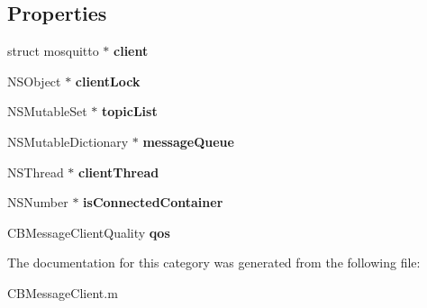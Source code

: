 \subsection*{Properties}
\begin{DoxyCompactItemize}
\item 
\hypertarget{category_c_b_message_client_07_08_a6dd8044dd2d87c74a8274dd2d772d18c}{struct mosquitto $\ast$ {\bfseries client}}\label{category_c_b_message_client_07_08_a6dd8044dd2d87c74a8274dd2d772d18c}

\item 
\hypertarget{category_c_b_message_client_07_08_a8ea5e9fc7bd6109f0e0bf0a5149ce281}{N\+S\+Object $\ast$ {\bfseries client\+Lock}}\label{category_c_b_message_client_07_08_a8ea5e9fc7bd6109f0e0bf0a5149ce281}

\item 
\hypertarget{category_c_b_message_client_07_08_a352f0fd7c3c5b009801f1d5164fe684f}{N\+S\+Mutable\+Set $\ast$ {\bfseries topic\+List}}\label{category_c_b_message_client_07_08_a352f0fd7c3c5b009801f1d5164fe684f}

\item 
\hypertarget{category_c_b_message_client_07_08_a084c1c0326a36184f673f698eb82cd34}{N\+S\+Mutable\+Dictionary $\ast$ {\bfseries message\+Queue}}\label{category_c_b_message_client_07_08_a084c1c0326a36184f673f698eb82cd34}

\item 
\hypertarget{category_c_b_message_client_07_08_ab510d95792c9d50028d6fa2d34a1a995}{N\+S\+Thread $\ast$ {\bfseries client\+Thread}}\label{category_c_b_message_client_07_08_ab510d95792c9d50028d6fa2d34a1a995}

\item 
\hypertarget{category_c_b_message_client_07_08_a481825e10342415caf9e0f592b606bc5}{N\+S\+Number $\ast$ {\bfseries is\+Connected\+Container}}\label{category_c_b_message_client_07_08_a481825e10342415caf9e0f592b606bc5}

\item 
\hypertarget{category_c_b_message_client_07_08_a7f10d284507cb889192b0a8ea8de88cc}{C\+B\+Message\+Client\+Quality {\bfseries qos}}\label{category_c_b_message_client_07_08_a7f10d284507cb889192b0a8ea8de88cc}

\end{DoxyCompactItemize}


The documentation for this category was generated from the following file\+:\begin{DoxyCompactItemize}
\item 
C\+B\+Message\+Client.\+m\end{DoxyCompactItemize}
